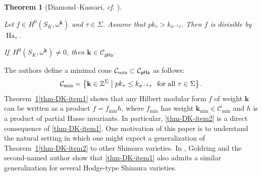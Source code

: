 \documentclass[11pt]{amsart}
\numberwithin{equation}{section}
\newtheorem{theorem}{Theorem}[section]
\theoremstyle{definition}
\theoremstyle{remark}
\newcommand{\pha}{\mathsf{pHa}}
\newcommand{\Ccal}{{\mathcal C}}
\newcommand{\ZZ}{\mathbb{Z}}
\DeclareMathOperator{\Ha}{Ha}
\newcommand{\relmiddle}[1]{\mathrel{}\middle#1\mathrel{}}
\begin{document}
\begin{theorem}[Diamond--Kassaei, \textit{cf.} {\cite[Theorem 5.1 and Corollary 5.4]{Diamond-Kassaei-comp-minimal}}] \label{thmDK} \ 
\begin{assertionlist}
    \item\label{thm-DK-item1} Let $f\in H^0(S_K,\omega^\mathbf{k})$ and $\tau \in \Sigma$. Assume that $pk_\tau > k_{\sigma^{-1}\tau}$. Then $f$ is divisible by $\Ha_{\tau}$.
    \item\label{thm-DK-item2} If\, $H^0(S_K,\omega^\mathbf{k})\neq 0$, then $\mathbf{k}\in \Ccal_{\pha}$.
\end{assertionlist}
\end{theorem}
The authors define a minimal cone $\Ccal_{\rm min}\subset \Ccal_{\pha}$ as follows:
\begin{equation}
    \Ccal_{\rm min}=\left\{\mathbf{k}\in \ZZ^\Sigma \relmiddle| pk_\tau \leq k_{\sigma^{-1}\tau} \ \textrm{ for all }\tau\in \Sigma\right\}.
\end{equation}
Theorem~\ref{thmDK}\eqref{thm-DK-item1} shows that any Hilbert modular form $f$ of weight $\mathbf{k}$ can be written as a product $f=f_{\min} h$, where $f_{\min}$ has weight $\mathbf{k}_{\min}\in \Ccal_{\min}$ and $h$ is a product of partial Hasse invariants. In particular, \eqref{thm-DK-item2} is a direct consequence of \eqref{thm-DK-item1}. One motivation of this paper is to understand the natural setting in which one might expect a generalization of Theorem~\ref{thmDK}\eqref{thm-DK-item2} to other Shimura varieties. In \cite{Goldring-Koskivirta-divisibility}, Goldring and the second-named author show that \eqref{thm-DK-item1} also admits a similar generalization for several Hodge-type Shimura varieties.
\end{document}
